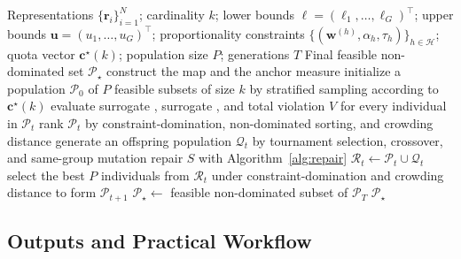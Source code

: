 \documentclass[10pt,journal]{IEEEtran}
\newcommand{\1}{\mathbf{1}}
\newcommand{\br}{\mathbf{r}}
\newcommand{\bw}{\mathbf{w}}
\newcommand{\bc}{\mathbf{c}}
\theoremstyle{ieeethm}
\begin{document}
\begin{algorithm}[t]
\caption{Constrained  for $(f_{\mathrm{MMD}},f_{\mathrm{SH}})$ under  Constraints}
\label{alg:nsga}
\begin{algorithmic}[1]
\Require
Representations $\{\br_i\}_{i=1}^{N}$; cardinality $k$; lower bounds $\boldsymbol{\ell}=(\ell_1,\dots,\ell_G)^\top$; upper bounds $\mathbf u=(u_1,\dots,u_G)^\top$; proportionality constraints $\{(\bw^{(h)},\alpha_h,\tau_h)\}_{h\in\mathcal H}$; quota vector $\bc^\star(k)$; population size $P$; generations $T$
\Ensure
Final feasible non-dominated set $\mathcal P_\star$
\State construct the  map and the anchor measure
\State initialize a population $\mathcal P_0$ of $P$ feasible subsets of size $k$ by stratified sampling according to $\bc^\star(k)$
    \State evaluate surrogate , surrogate , and total violation $V$ for every individual in $\mathcal P_t$
    \State rank $\mathcal P_t$ by constraint-domination, non-dominated sorting, and crowding distance
    \State generate an offspring population $\mathcal Q_t$ by tournament selection, crossover, and same-group mutation
        \State repair $S$ with Algorithm~\ref{alg:repair}
    \EndFor
    \State $\mathcal R_t\gets \mathcal P_t\cup \mathcal Q_t$
    \State select the best $P$ individuals from $\mathcal R_t$ under constraint-domination and crowding distance to form $\mathcal P_{t+1}$
\EndFor
\State $\mathcal P_\star\gets$ feasible non-dominated subset of $\mathcal P_T$
\State \Return $\mathcal P_\star$
\end{algorithmic}
\end{algorithm}

\subsection{Outputs and Practical Workflow}
\label{subsec:complexity}
\end{document}
